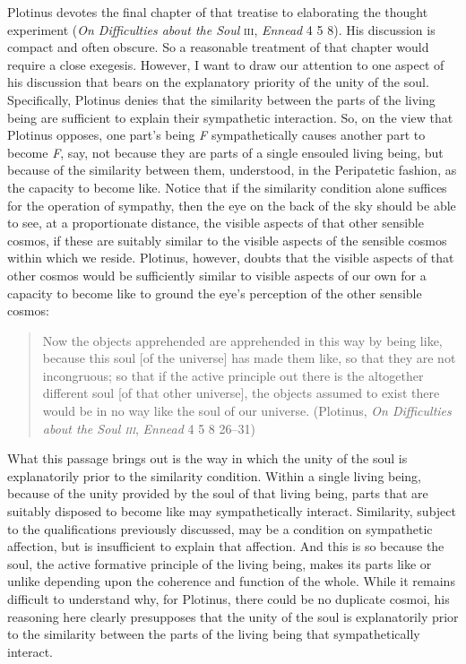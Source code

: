 Plotinus devotes the final chapter of that treatise to elaborating the thought experiment (\emph{On Difficulties about the Soul} \textsc{iii}, \emph{Ennead} 4 5 8). His discussion is compact and often obscure. So a reasonable treatment of that chapter would require a close exegesis. However, I want to draw our attention to one aspect of his discussion that bears on the explanatory priority of the unity of the soul. Specifically, Plotinus denies that the similarity between the parts of the living being are sufficient to explain their sympathetic interaction. So, on the view that Plotinus opposes, one part's being \emph{F} sympathetically causes another part to become \emph{F}, say, not because they are parts of a single ensouled living being, but because of the similarity between them, understood, in the Peripatetic fashion, as the capacity to become like. Notice that if the similarity condition alone suffices for the operation of sympathy, then the eye on the back of the sky should be able to see, at a proportionate distance, the visible aspects of that other sensible cosmos, if these are suitably similar to the visible aspects of the sensible cosmos within which we reside. Plotinus, however, doubts that the visible aspects of that other cosmos would be sufficiently similar to visible aspects of our own for a capacity to become like to ground the eye's perception of the other sensible cosmos:
\begin{quote}
	Now the objects apprehended are apprehended in this way by being like, because this soul [of the universe] has made them like, so that they are not incongruous; so that if the active principle out there is the altogether different soul [of that other universe], the objects assumed to exist there would be in no way like the soul of our universe. (Plotinus, \emph{On Difficulties about the Soul \textsc{iii}}, \emph{Ennead} 4 5 8 26--31)
\end{quote}
What this passage brings out is the way in which the unity of the soul is explanatorily prior to the similarity condition. Within a single living being, because of the unity provided by the soul of that living being, parts that are suitably disposed to become like may sympathetically interact. Similarity, subject to the qualifications previously discussed, may be a condition on sympathetic affection, but is insufficient to explain that affection. And this is so because the soul, the active formative principle of the living being, makes its parts like or unlike depending upon the coherence and function of the whole. While it remains difficult to understand why, for Plotinus, there could be no duplicate cosmoi, his reasoning here clearly presupposes that the unity of the soul is explanatorily prior to the similarity between the parts of the living being that sympathetically interact.


